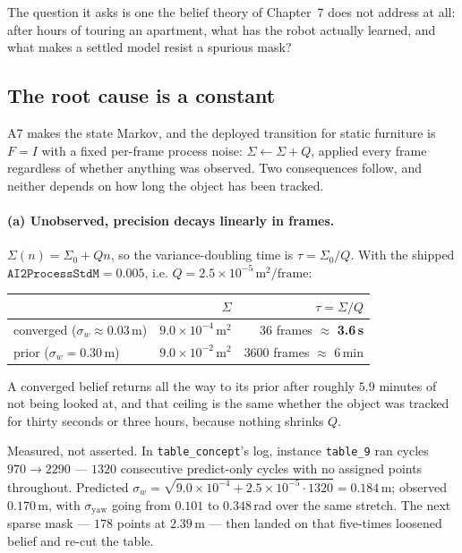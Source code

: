 \documentclass[11pt,a4paper]{report}
\begin{document}
The question it asks is one the belief theory of Chapter~7 does not address at all: after hours of
touring an apartment, what has the robot actually learned, and what makes a settled model resist a
spurious mask?

\subsection{The root cause is a constant}
\label{sec:constantQ}

A7 makes the state Markov, and the deployed transition for static furniture is $F=I$ with a fixed
per-frame process noise: $\Sigma\leftarrow\Sigma+Q$, applied every frame regardless of whether
anything was observed. Two consequences follow, and neither depends on how long the object has been
tracked.

\paragraph{(a) Unobserved, precision decays linearly in frames.} $\Sigma(n)=\Sigma_0+Qn$, so the
variance-doubling time is $\tau=\Sigma_0/Q$. With the shipped $\texttt{AI2ProcessStdM}=0.005$, i.e.
$Q=2.5\times10^{-5}\,\mathrm{m^2/frame}$:

\begin{center}
\begin{tabular}{@{}lrr@{}}
\toprule
& $\Sigma$ & $\tau=\Sigma/Q$ \\
\midrule
converged ($\sigma_w\approx0.03$\,m) & $9.0\times10^{-4}\,\mathrm{m^2}$ & 36 frames $\approx$ \textbf{3.6\,s} \\
prior ($\sigma_w=0.30$\,m)           & $9.0\times10^{-2}\,\mathrm{m^2}$ & 3600 frames $\approx$ 6\,min \\
\bottomrule
\end{tabular}
\end{center}

\noindent
A converged belief returns all the way to its prior after roughly $5.9$ minutes of not being looked
at, and that ceiling is the same whether the object was tracked for thirty seconds or three hours,
because nothing shrinks $Q$.

Measured, not asserted. In \texttt{table\_concept}'s log, instance \texttt{table\_9} ran cycles
$970\rightarrow2290$ --- $1320$ consecutive predict-only cycles with no assigned points throughout.
Predicted $\sigma_w=\sqrt{9.0\times10^{-4}+2.5\times10^{-5}\cdot1320}=0.184$\,m; observed
$\mathbf{0.170}$\,m, with $\sigma_{\mathrm{yaw}}$ going from $0.101$ to $0.348$\,rad over the same
stretch. The next sparse mask --- $178$ points at $2.39$\,m --- then landed on that five-times
loosened belief and re-cut the table.
\end{document}
